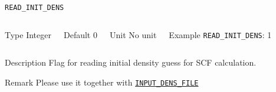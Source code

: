     
    \begin{frame}[allowframebreaks]{\texttt{READ\_INIT\_DENS}} \label{READ_INIT_DENS}
    \vspace*{-12pt}
    \begin{columns}
    \begin{block}{Type}
    Integer
    \end{block}
    
    \begin{block}{Default}
    0
    \end{block}
    
    \begin{block}{Unit}
    No unit
    \end{block}
    
    \begin{block}{Example}
    \texttt{READ\_INIT\_DENS}: 1
    \end{block}
    \end{columns}
    
    \begin{block}{Description}
    Flag for reading initial density guess for SCF calculation. 
    \end{block}
    
    \begin{block}{Remark}
    Please use it together with \hyperlink{INPUT_DENS_FILE}{\texttt{INPUT\_DENS\_FILE}}
    \end{block}
    
    \end{frame}
        